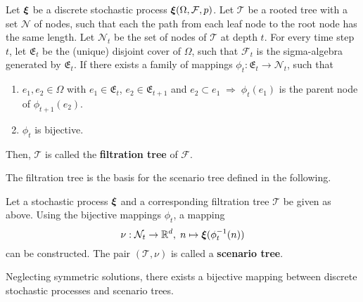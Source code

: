 \begin{definition}
  Let $\boldsymbol\xi$ be a discrete stochastic process $\boldsymbol\xi(\Omega, \mathcal{F}, p)$.
  Let $\mathcal{T}$ be a rooted tree with a set $\mathcal{N}$ of nodes, such that each the path from each leaf node to the root node has the same length.
  Let $\mathcal{N}_t$ be the set of nodes of $\mathcal{T}$ at depth $t$.
  For every time step $t$, let $\mathfrak{E}_t$ be the (unique) disjoint cover of $\Omega$, such that $\mathcal{F}_t$ is the sigma-algebra generated by $\mathfrak{E}_t$.
  If there exists a family of mappings $\phi_t:\mathfrak{E}_t\rightarrow \mathcal{N}_t$, such that 
  \begin{enumerate}
  \item  $e_1,e_2\in\Omega$ with $e_1\in\mathfrak{E}_t$, $e_2\in\mathfrak{E}_{t+1}$ and $e_2\subset e_1\;\Rightarrow\;\phi_t(e_1)$ is the parent node of $\phi_{t+1}(e_2)$.
  \item $\phi_t$ is bijective.
  \end{enumerate}
  Then, $\mathcal{T}$ is called the \textbf{filtration tree} of $\mathcal{F}$.
\end{definition}
The filtration tree is the basis for the scenario tree defined in the following.
\begin{definition}
  Let a stochastic process $\boldsymbol\xi$ and a corresponding filtration tree $\mathcal{T}$ be given as above.
  Using the bijective mappings $\phi_t$, a mapping 
  \[
  \nu:\mathcal{N}_t\rightarrow\mathbb{R}^d,\; n\mapsto \boldsymbol\xi(\phi_t^{-1}(n))
  \]
  can be constructed.
  The pair $(\mathcal{T}, \nu)$ is called a \textbf{scenario tree}.
\end{definition}
Neglecting symmetric solutions, there exists a bijective mapping between discrete stochastic processes and scenario trees.

